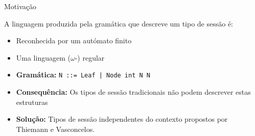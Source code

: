 \begin{frame}[fragile]{Motivação}
  \begin{tcolorbox}[colback=blue!5,colframe=blue!60!black,title=Facto,arc=2pt,outer arc=2pt]
    A linguagem produzida pela gramática que descreve um tipo de sessão é:
    \begin{itemize}
    \item Reconhecida por um autómato finito
    \item Uma linguagem ($\omega$-) regular
    \end{itemize}
  \end{tcolorbox}
  \begin{itemize}
  \item \textbf{Gramática:} \lstinline"N ::= Leaf | Node int N N" 
  \item \textbf{Consequência:} Os tipos de sessão tradicionais não podem descrever estas estruturas
  \item \textbf{Solução:} Tipos de sessão independentes do contexto propostos por Thiemann e Vasconcelos.
  \end{itemize}
\end{frame}


